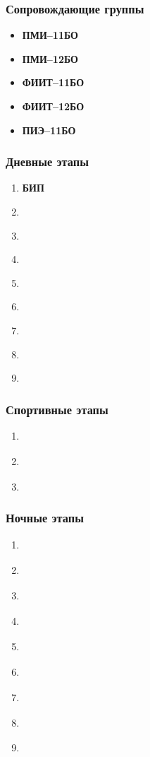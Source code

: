 \newpage
{}

\subsubsection*{Сопровождающие группы}
\begin{itemize}
\item \textbf{ПМИ--11БО}
\item \textbf{ПМИ--12БО}
\item \textbf{ФИИТ--11БО}
\item \textbf{ФИИТ--12БО}
\item \textbf{ПИЭ--11БО}
\end{itemize}

\subsubsection*{Дневные этапы}
\begin{enumerate}
\item \textbf{БИП}
\item \textbf{}
\item \textbf{}
\item \textbf{}
\item \textbf{}
\item \textbf{}
\item \textbf{}
\item \textbf{}
\item \textbf{}
\end{enumerate}

\subsubsection*{Спортивные этапы}
\begin{enumerate}
\item \textbf{}
\item \textbf{}
\item \textbf{}
\end{enumerate}

\subsubsection*{Ночные этапы}
\begin{enumerate}
\item \textbf{}
\item \textbf{}
\item \textbf{}
\item \textbf{}
\item \textbf{}
\item \textbf{}
\item \textbf{}
\item \textbf{}
\item \textbf{}
\end{enumerate}
